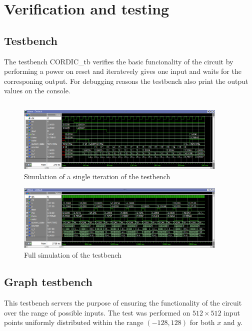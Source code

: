 \chapter{Verification and testing}

\section{Testbench}
The testbench CORDIC\_tb verifies the basic funcionality of the circuit by performing a power on reset and iteratevely gives one input and waits for the corresponing output. For debugging reasons the testbench also print the output values on the console.

\begin{code}
    \inputminted{vhdl}{../vhdl/tb/CORDIC_tb.vhd}
    \label{code:testbench}
\end{code}

\begin{figure}[!ht]
    \centering
    \includegraphics[width=0.9\textwidth]{./images/Verification/wavesmall.png}
    \caption{Simulation of a single iteration of the testbench}
    \label{fig:wavesmall}
\end{figure}

\begin{figure}[!ht]
    \centering
    \includegraphics[width=0.9\textwidth]{./images/Verification/wavebig.png}
    \caption{Full simulation of the testbench}
    \label{fig:wavebig}
\end{figure}


\section{Graph testbench}
This testbench servers the purpose of ensuring the functionality of the circuit over the range of possible inputs. The test was performed on \( 512 \times 512 \)  input points uniformly distributed within the range \( (-128, 128) \) for both \( x \) and \( y \).

